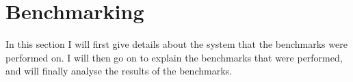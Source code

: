 \chapter{Benchmarking}
In this section I will first give details about the system that the benchmarks were performed on.
I will then go on to explain the benchmarks that were performed, and will finally analyse the results of the benchmarks.







